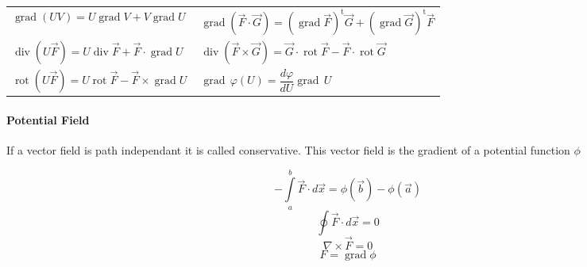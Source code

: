 {\begin{tabularx}{\textwidth}{|X|X|}
		$\operatorname{grad}(UV)=U\operatorname{grad}V+V\operatorname{grad}U $ &
		$\operatorname{grad}(\vec{F}\cdot \vec{G}) = (\operatorname{grad}\vec{F})^{\operatorname t}\vec{G} + (\operatorname{grad}\vec{G})^{\operatorname t}\vec{F} $ \\

		$	\operatorname{div}(U\vec{F})=U\operatorname{div}\vec{F}+\vec{F}\cdot\operatorname{grad}U $&
		$\operatorname{div}(\vec{F}\times \vec{G})= \vec{G} \cdot\operatorname{rot}\vec{F} -\vec{F}\cdot\operatorname{rot}\vec{G} $ \\				

		$\operatorname{rot}(U\vec{F})= U\operatorname{rot}\vec{F}-\vec{F}\times\operatorname{grad}U\ $& 
		$\operatorname{grad}\,\varphi(U) = \dfrac{d\varphi}{dU}\operatorname{grad}\,U$
		\\
		\hline
	
		
	\end{tabularx}
}
\renewcommand{\arraystretch}{1.2}		

	\paragraph{Potential Field}
		If a vector field is path independant it is called conservative. This vector field is the gradient of a potential function $\phi$
		
		\begin{multicols}{3}
			$$ -\int\limits_a^b \vec F\cdot d\vec x = \phi(\vec b) - \phi(\vec a) $$ \vfill\columnbreak
			$$ \oint \vec F\cdot d\vec x = 0 $$ 
			$$ \nabla \times \vec F = 0  $$ \vfill\columnbreak
			$$ F = \operatorname{grad}\phi $$
		\end{multicols}
		
		
